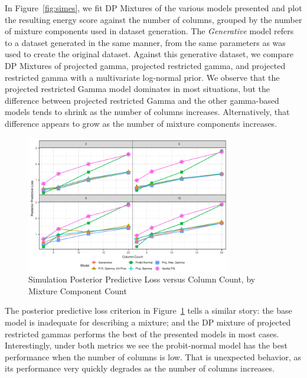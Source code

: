 In Figure~\ref{fig:simes}, we fit DP Mixtures of the various models presented and plot the resulting
  energy score against the number of columns, grouped by the number of mixture components used in
  dataset generation.  The \emph{Generative} model refers to a dataset generated
  in the same manner, from the same parameters as was used to create the original dataset.  Against
  this generative dataset, we compare DP Mixtures of projected gamma, projected restricted gamma, and
  projected restricted gamma with a multivariate log-normal prior.  We observe that the projected
  restricted Gamma model dominates in most situations, but the difference between projected restricted
  Gamma and the other gamma-based models tends to shrink as the number of columns increases.
  Alternatively, that difference appears to grow as the number of mixture components increases.

\begin{figure}[h]
  \label{fig:simppl}
  \caption{Simulation Posterior Predictive Loss versus Column Count, by Mixture Component Count}
  \centering
  \includegraphics[width=0.8\textwidth]{./images/simulation_ppl}
\end{figure}

The posterior predictive loss criterion in Figure~\ref{fig:simppl} tells a similar story: the base
  model is inadequate for describing a mixture; and the DP mixture of projected restricted gammas
  performs the best of the presented models in most cases.  Interestingly, under both metrics we see
  the probit-normal model has the best performance when the number of columns is low.  That is
  unexpected behavior, as its performance very quickly degrades as the number of columns increases.

